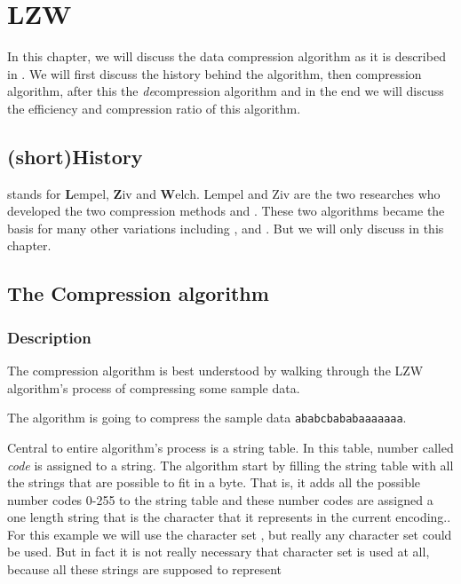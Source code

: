 \begin{comment}
  
\end{comment}

\chapter{LZW}
\label{ch:rle}

\begin{refsection}

  In this chapter, we will discuss the data compression algorithm
  \lzw{} as it is described in
  \cite{nelson89:_lzw_data_compr,Welch:1984:THD:1319729.1320134,Salomon:2004:DCC}. We
  will first discuss the history behind the algorithm, then
  compression algorithm, after this the
  \textit{de}compression algorithm and in the end we will discuss the
  efficiency and compression ratio of this algorithm.

\section{(short)History}

\lzw stands for \textbf{L}empel, \textbf{Z}iv and
\textbf{W}elch. Lempel and Ziv are the two researches who developed
the two compression methods \lzseven and \lzeight. These two
algorithms became the basis for many other \lz variations including
\lzma \cite{palov11}, \lzw and \lzss \cite{Salomon:2004:DCC}. But we
will only discuss \lzw in this chapter.

\section{The Compression algorithm}

\subsection{Description}
\label{sec:lzw-desc}

The \lzw compression algorithm is best
understood by walking through the LZW algorithm's process of
compressing some sample data.

The algorithm is going to compress the sample data
\texttt{ababcbababaaaaaaa}.

Central to entire algorithm's process is a string table. In this
table, number called \textit{code} is assigned to a
string. The algorithm start by filling the string table with all the
strings that are possible to fit in a byte. That is, it adds all the
possible number codes 0-255 to the string table and these number codes
are assigned a one length string that is the character that it
represents in the current encoding.. For this example we will use the
character set \ascii \cite{rfc20}, but really any character set could
be used. But in fact it is not really necessary that character set is
used at all, because all these strings are supposed to represent


\end{refsection}
